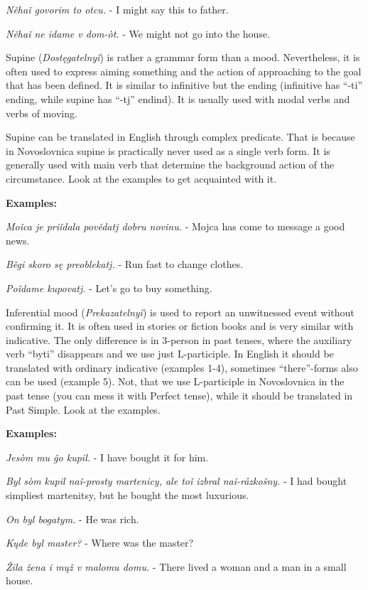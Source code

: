 \textit{Něhaǐ govorim to otcu.} - I might say this to father.

\textit{Něhaǐ ne idame v dom-òt.} - We might not go into the house.


Supine (\textit{Dostęgatelnyǐ}) is rather a grammar form than a mood. Nevertheless, it is often used to express aiming something and the action of approaching to the goal that has been defined. It is similar to infinitive but the ending (infinitive has “-ti” ending, while supine has “-tj” endind). It is usually used with modal verbs and verbs of moving.

Supine can be translated in English through complex predicate. That is because in Novoslovnica supine is practically never used as a single verb form. It is generally used with main verb that determine the background action of the circumstance. Look at the examples to get acquainted with it.

\textbf{Examples:}

\textit{Moǐca je priǐdala povědatj dobru novinu.} - Mojca has come to message a good news.

\textit{Běgi skoro sę preoblekatj.} - Run fast to change clothes.

\textit{Poǐdame kupovatj.} - Let’s go to buy something.

Inferential mood (\textit{Prekazatelnyǐ}) is used to report an unwitnessed event without confirming it. It is often used in stories or fiction books and is very similar with indicative. The only difference is in 3-person in past tenses, where the auxiliary verb “byti” disappears and we use just L-participle. In English it should be translated with ordinary indicative (examples 1-4), sometimes “there”-forms also can be used (example 5). Not, that we use L-participle in Novoslovnica in the past tense (you can mess it with Perfect tense), while it should be translated in Past Simple.
Look at the examples.

\textbf{Examples:}

\textit{Jesòm mu ĝo kupil.} - I have bought it for him.

\textit{Byl sòm kupil naǐ-prosty martenicy, ale toǐ izbral naǐ-råzkošny.} - I had bought simpliest martenitsy, but he bought the most luxurious.

\textit{On byl bogatym.} - He was rich.

\textit{Kųde byl master?} - Where was the master?

\textit{Žila žena i mųž v malomu domu.} - There lived a woman and a man in a small house.
